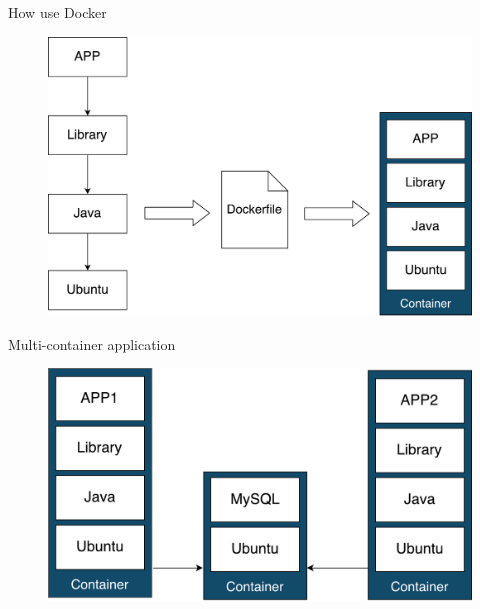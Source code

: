 \documentclass{beamer}
\begin{document}
  \begin{frame}{How use Docker}
    \begin{figure}
      \includegraphics[width=1\textwidth]{img/docker_build.pdf}
    \end{figure}
  \end{frame}

  \begin{frame}{Multi-container application}
    \begin{figure}
      \includegraphics[width=1\textwidth]{img/docker_multicontainer.pdf}
    \end{figure}
  \end{frame}
\end{document}
